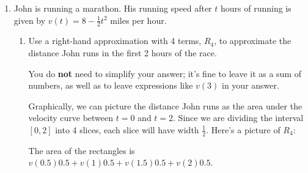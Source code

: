 \documentclass{article}
\begin{document}
\begin{enumerate}
\begin{enumerate}[resume]
      \begin{solution}
        The vat .  For example, the number of
        pickles produced between $t = 1$ and $t = 9$ (which can be
        visualized as the area under $P(t)$ from $t = 1$ to $t = 9$) is
        less than the number of pickles that the pipe could take away
        (which can be visualized as the area under $y = 2$ from $t = 1$ to
        $t = 9$).  That means that the pipe has been able to empty the vat
        out sometime before $t = 9$.
      \end{solution}

    \end{enumerate}

\item \label{spring2012-mb-midterm2-4}


  John is running a marathon.  His running speed after $t$ hours of
  running is given by $v(t) = 8-\frac{1}{2}t^2$ miles per hour.

  \begin{enumerate}

  \item
    \begin{problem}[\vfill]
      Use a right-hand approximation with 4 terms, $R_4$, to approximate
      the distance John runs in the first 2 hours of the race.

      You do \textbf{not} need to simplify your answer; it's fine to leave
      it as a sum of numbers, as well as to leave expressions like $v(3)$
      in your answer.
    \end{problem}

    \begin{solution}
      Graphically, we can picture the distance John runs as the area under
      the velocity curve between $t=0$ and $t=2$.  Since we are dividing
      the interval $[0,2]$ into 4 slices, each slice will have width
      $\frac{1}{2}$.  Here's a picture of $R_4$:
      \begin{center}
      \end{center}
      The area of the rectangles is $\boxed{v(0.5) 0.5 + v(1) 0.5 + v(1.5)
        0.5 + v(2) 0.5}$. 
    \end{solution}


\end{enumerate}
\end{enumerate}
\end{document}
